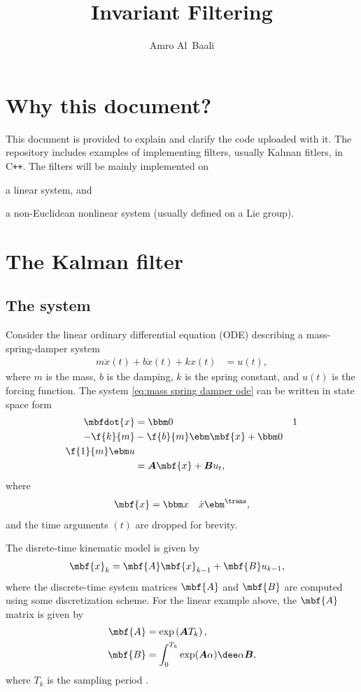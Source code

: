 \documentclass[nobib, nofonts, notoc, justified]{tufte-handout}
\title{Invariant Filtering}
\author{Amro Al~Baali}
\newcommand{\cpp}{C\texttt{++}\xspace}
\begin{document}
  {  
    
    \tableofcontents
    \clearpage
  }
  
  \section{Why this document?}
  This document is provided to explain and clarify the code uploaded with it.
  The repository includes examples of implementing filters, usually Kalman fitlers, in \cpp.
  The filters will be mainly implemented on 
  \begin{packed_enum}
    \item a linear system, and
    \item a non-Euclidean nonlinear system (usually defined on a Lie group).
  \end{packed_enum}

  \section{The Kalman filter}
  \subsection{The system}
  Consider the linear ordinary differential equation (ODE) describing a mass-spring-damper system
  \begin{align}
    \label{eq:mass spring damper ode}
    m\ddot{x}(t) + b\dot{x}(t) + kx(t) &= u(t),
  \end{align}
  where $m$ is the mass, $b$ is the damping, $k$ is the spring constant, and $u(t)$ is the forcing function. The system \eqref{eq:mass spring damper ode} can be written in state space form
  \begin{align}
    \mbfdot{x} &= \bbm 0 & 1\\ -\f{k}{m} & -\f{b}{m} \ebm \mbf{x} + \bbm 0\\\f{1}{m} \ebm u\\
    &= \boldsymbol{A}\mbf{x} + \boldsymbol{B}u_{t},
  \end{align}
  where 
  \begin{align}
    \label{eq:DT linear kinematic model}
    \mbf{x} &= \bbm x & \dot{x} \ebm^{\trans},
  \end{align}
  and the time arguments $(t)$ are dropped for brevity.

  The disrete-time kinematic model is given by
  \begin{align}
    \mbf{x}_{k} &= \mbf{A}\mbf{x}_{k-1} + \mbf{B}u_{k-1},    
  \end{align}
  where the discrete-time system matrices $\mbf{A}$ and $\mbf{B}$ are computed using some discretization scheme. For the linear example above, the $\mbf{A}$ matrix is given by
  \begin{align}
    \mbf{A} &= \exp\left( \boldsymbol{A} T_{k} \right),\\
    \mbf{B} &= \int_{0}^{T_{k}}\exp(\boldsymbol{A}\alpha)\dee\alpha \boldsymbol{B},
  \end{align}
  where $T_{k}$ is the sampling period \cite{Farrell_Aided_2008}.
   
\end{document}
